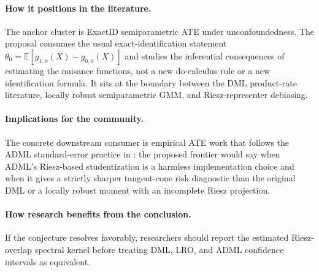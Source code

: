 \documentclass[11pt]{article}
\newcommand{\E}{\mathbb{E}}
\theoremstyle{definition}
\theoremstyle{plain}
\theoremstyle{remark}
\begin{document}
\paragraph{How it positions in the literature.}
The anchor cluster is ExactID semiparametric ATE under unconfoundedness.  The
proposal consumes the usual exact-identification statement
\(\theta_0=\E[g_{1,0}(X)-g_{0,0}(X)]\) and studies the inferential consequences of
estimating the nuisance functions, not a new do-calculus rule or a new
identification formula.  It sits at the boundary between the DML product-rate
literature, locally robust semiparametric GMM, and Riesz-representer debiasing.

\paragraph{Implications for the community.}
The concrete downstream consumer is empirical ATE work that follows the ADML
standard-error practice in \citet{ChernozhukovNeweySingh2022ADML}: the proposed
frontier would say when ADML's Riesz-based studentization is a harmless
implementation choice and when it gives a strictly sharper tangent-cone risk
diagnostic than the original DML or a locally robust moment with an incomplete
Riesz projection.

\paragraph{How research benefits from the conclusion.}
If the conjecture resolves favorably, researchers should report the estimated
Riesz-overlap spectral kernel before treating DML, LRO, and ADML confidence
intervals as equivalent.
\end{document}
